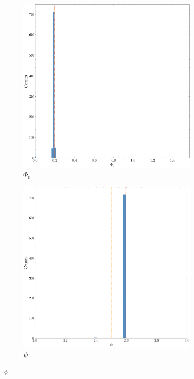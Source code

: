 \documentclass[fleqn,usenatbib,useAMS]{mnras}
\begin{document}
\begin{figure}
\begin{subfigure}[b]{0.3\textwidth}
		\includegraphics[width=\textwidth]{images/distribution_phi0_gw}
		\caption{$\Phi_0$}
	\end{subfigure}
	\hfill	
	\begin{subfigure}[b]{0.3\textwidth}
		\includegraphics[width=\textwidth]{images/distribution_psi_gw}
		\caption{$\psi$}
	\end{subfigure}
	\medskip
	

\end{figure}
\end{document}
